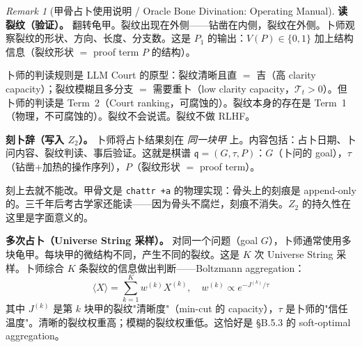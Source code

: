 \documentclass[11pt,a4paper]{article}
\theoremstyle{definition}
\theoremstyle{remark}
\newtheorem{remark}[theorem]{Remark}
\begin{document}
\begin{remark}[甲骨占卜使用说明 / Oracle Bone Divination: Operating Manual]
\textbf{读裂纹（验证）。}
翻转龟甲。裂纹出现在外侧——钻凿在内侧，裂纹在外侧。卜师观察裂纹的形状、方向、长度、分支数。这是 $P_1$ 的输出：$V(P) \in \{0, 1\}$ 加上结构信息（裂纹形状 $=$ proof term $P$ 的结构）。

卜师的判读规则是 LLM Court 的原型：裂纹清晰且直 $=$ 吉（高 clarity capacity）；裂纹模糊且多分支 $=$ 需要重卜（low clarity capacity，$\mathcal{T}_t > 0$）。但卜师的判读是 Term~2（Court ranking，可腐蚀的）。裂纹本身的存在是 Term~1（物理，不可腐蚀的）。裂纹不会说谎。裂纹不做 RLHF。

\textbf{刻卜辞（写入 $Z_2$）。}
卜师将占卜结果刻在 \emph{同一块甲} 上。内容包括：占卜日期、卜问内容、裂纹判读、事后验证。这就是棋谱 $\mathfrak{q} = (G, \tau, P)$：$G$（卜问的 goal），$\tau$（钻凿+加热的操作序列），$P$（裂纹形状 $=$ proof term）。

刻上去就不能改。甲骨文是 \texttt{chattr +a} 的物理实现：骨头上的刻痕是 append-only 的。三千年后考古学家还能读——因为骨头不腐烂，刻痕不消失。$Z_2$ 的持久性在这里是字面意义的。

\textbf{多次占卜（Universe String 采样）。}
对同一个问题（goal $G$），卜师通常使用多块龟甲。每块甲的微结构不同，产生不同的裂纹。这是 $K$ 次 Universe String 采样。卜师综合 $K$ 条裂纹的信息做出判断——Boltzmann aggregation：
\[
  \langle X \rangle = \sum_{k=1}^K w^{(k)} X^{(k)}, \quad w^{(k)} \propto e^{-J^{(k)}/\tau}
\]
其中 $J^{(k)}$ 是第 $k$ 块甲的裂纹"清晰度"（min-cut 的 capacity），$\tau$ 是卜师的"信任温度"。清晰的裂纹权重高；模糊的裂纹权重低。这恰好是 \S B.5.3 的 soft-optimal aggregation。
\end{remark}
\end{document}
